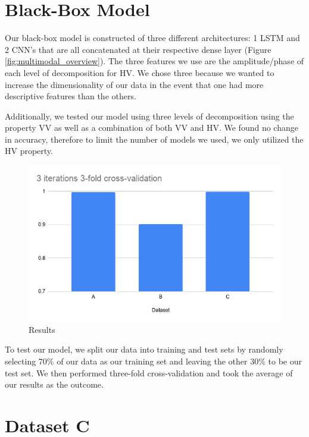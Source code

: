 \documentclass{turabian-thesis}
\begin{document}
\section{Black-Box Model}
Our black-box model is constructed of three different architectures: 1 LSTM and 2 CNN’s that are all concatenated at their respective dense layer (Figure \ref{fig:multimodal_overview}). The three features we use are the amplitude/phase of each level of decomposition for HV. We chose three because we wanted to increase the dimensionality of our data in the event that one had more descriptive features than the others. 

Additionally, we tested our model using three levels of decomposition using the property VV as well as a combination of both VV and HV. We found no change in accuracy, therefore to limit the number of models we used, we only utilized the HV property.


\begin{figure}[h!]
   \begin{center}
      \includegraphics[scale=0.6]{../media/results.png}
   \end{center}
   \caption{Results}
   \label{fig:final_results}
\end{figure}


To test our model, we split our data into training and test sets by randomly selecting 70\% of our data as our training set and leaving the other 30\% to be our test set. We then performed three-fold cross-validation and took the average of our results as the outcome.



\section{Dataset C}
\end{document}
